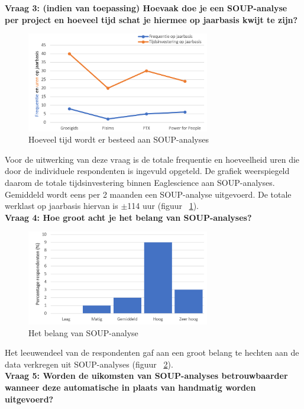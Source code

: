 \textbf{Vraag 3: (indien van toepassing) Hoevaak doe je een SOUP-analyse per project en hoeveel tijd schat je hiermee op jaarbasis kwijt te zijn?}\\
\begin{figure}[bth]
    \centering
    \includegraphics[width=8cm]{gfx/appendix/Vraag3}
    \caption{Hoeveel tijd wordt er besteed aan SOUP-analyses}
    \label{fig:EnqueteV3}
\end{figure}

Voor de uitwerking van deze vraag is de totale frequentie en hoeveelheid    uren die door de individuele respondenten is ingevuld opgeteld. De grafiek weerspiegeld daarom de totale tijdsinvestering binnen Eaglescience aan SOUP-analyses. Gemiddeld wordt eens per 2 maanden een SOUP-analyse uitgevoerd. De totale werklast op jaarbasis hiervan is $\pm$114 uur (figuur ~\ref{fig:EnqueteV3}).\\

\textbf{Vraag 4: Hoe groot acht je het belang van SOUP-analyses?}\\
\begin{figure}[bth]
    \centering
    \includegraphics[width=8cm]{gfx/appendix/Vraag4}
    \caption{Het belang van SOUP-analyse}
    \label{fig:EnqueteV4}
\end{figure}
Het leeuwendeel van de respondenten gaf aan een groot belang te hechten aan de data verkregen uit SOUP-analyses (figuur ~\ref{fig:EnqueteV4}).\\

\textbf{Vraag 5: Worden de uikomsten van SOUP-analyses betrouwbaarder wanneer deze automatische in plaats van handmatig worden uitgevoerd?}\\

